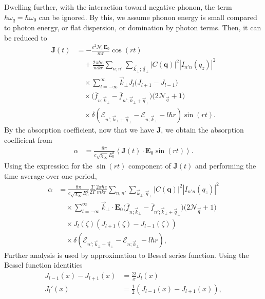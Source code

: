 \documentclass[%
 reprint,
 amsmath,amssymb,
 aps,
]{revtex4-2}
\begin{document}
Dwelling further, with the interaction toward negative phonon, the term $\hbar\omega_{q}=\hbar\omega_0$ can be ignored. By this, we assume phonon energy is small compared to photon energy, or flat dispersion, or domination by photon terms. Then, it can be reduced to 
\begin{align}
\mathbf{J}(t)
&= -\frac{e^2 \mathcal{N}_0 \mathbf{E}_0}{m r} \cos(rt)
\nonumber\\
&\quad
+ \frac{2\pi \hbar e}{m k r}
\sum_{n;n'}
\sum_{\vec{k}_\bot; \vec{q}_\bot}
|C(\mathbf{q})|^2
|I_{n'n}(q_z)|^2 \\
&\quad\times 
\sum_{l=-\infty}^{\infty}
\vec{k}_\bot
J_l
\big(J_{l+1} - J_{l-1}\big)
\nonumber\\
&\quad\times
\big(
\bar{f}_{n; \vec{k}_\bot}
-
\bar{f}_{n'; \vec{k}_\bot+\vec{q}_\bot}
\big)
\big(2\mathcal{N}_{\vec{q}} + 1\big)
\nonumber\\
&\quad\times
\delta\!\left(
\mathcal{E}_{n'; \vec{k}_\bot+\vec{q}_\bot}
-
\mathcal{E}_{n; \vec{k}_\bot}
-
l \hbar r
\right)
\sin(rt).
\end{align}
By the absorption coefficient, now that we have $\mathbf{J}$, we obtain the absorption coefficient from
\begin{align}
\alpha
&=
\frac{8\pi}{c \sqrt{\chi_\infty} E_0^2}
\left\langle
\mathbf{J}(t)\cdot\mathbf{E}_0 \sin(rt)
\right\rangle.
\end{align}
%
Using the expression for the $\sin(rt)$ component of $\mathbf{J}(t)$ and performing the time average over one period,
%
\begin{align}
\alpha
&=
\frac{8\pi}{c \sqrt{\chi_\infty} E_0^2}
\frac{T}{2T}
\frac{2\pi \hbar e}{m k r}
\sum_{n,n'}
\sum_{\vec{k}_\bot, \vec{q}_\bot}
|C(\mathbf q)|^2
|I_{n'n}(q_z)|^2
\nonumber\\
&\quad \times
\sum_{l=-\infty}^{\infty}
\vec{k}_\bot \cdot \mathbf{E}_0
\big(
\bar f_{n; \vec{k}_\bot}
-
\bar f_{n'; \vec{k}_\bot+\vec{q}_\bot}
\big)
\big(2\mathcal{N}_{\vec q}+1\big)
\nonumber\\
&\quad \times
J_l\!\left(\zeta\right)
\left(
J_{l+1}\!\left(\zeta\right)
-
J_{l-1}\!\left(\zeta\right)
\right)
\nonumber\\
&\quad \times
\delta\!\left(
\mathcal{E}_{n';\vec{k}_\bot+\vec{q}_\bot}
-
\mathcal{E}_{n;\vec{k}_\bot}
-
l\hbar r
\right),
\end{align}
Further analysis is used by approximation to Bessel series function. Using the Bessel function identities
\begin{equation}
\begin{split}
    J_{l-1}(x) - J_{l+1}(x)& = \frac{2l}{x} J_l(x) \\
J_l'(x) &= \frac{1}{2}\left(J_{l-1}(x)-J_{l+1}(x)\right),
\end{split}
\end{equation}
\end{document}
